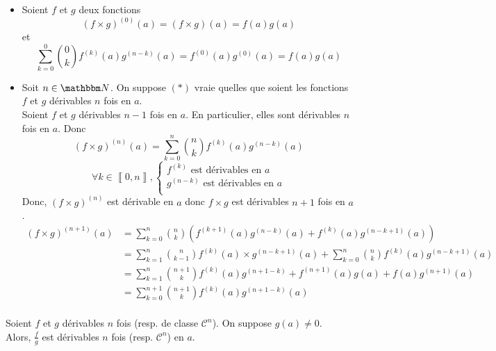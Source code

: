 \begin{prv}
	\begin{itemize}
		\item Soient $f$ et $g$ deux fonctions
			\[
				\left( f\times g \right) ^{(0)}(a) = \left( f\times g \right) (a) = f(a) g(a)
			\] et \[
				\sum_{k=0}^0 {0\choose k} f^{(k)}(a) g^{(n-k)}(a) = f^{(0)}(a) g^{(0)}(a) = f(a) g(a)
			\]
		\item Soit $n \in \N$. On suppose $(*)$ vraie quelles que soient les fonctions $f$ et $g$ dérivables $n$ fois en $a$.\\
			Soient $f$ et $g$ dérivables $n-1$ fois en $a$. En particulier, elles sont dérivables $n$ fois en $a$. Donc \[
				(f\times g)^{(n)}(a) = \sum_{k=0}^{n} {n\choose k} f^{(k)}(a) g^{(n-k)}(a)
			\]
			\[
				\forall k \in \left\llbracket 0,n \right\rrbracket,
				\begin{cases}
					f^{(k)} \text{ est dérivables en } a\\
					g^{(n-k)} \text{ est dérivables en } a\\
				\end{cases}
			\] 
			Donc, $(f\times g)^{(n)}$ est dérivable en $a$ donc $f\times g$ est dérivables $n+1$ fois en $a$.\\
			\begin{align*}
				(f\times g)^{(n+1)}(a)
				&= \sum_{k=0}^{n} {n\choose k} \left( f^{(k+1)}(a) g^{(n-k)}(a) + f^{(k)}(a)g^{(n-k+1)}(a) \right)  \\
				&= \sum_{k=1}^{n} {n\choose k-1} f^{(k)}(a) \times g^{(n-k+1)}(a)  + \sum_{k=0}^{n} {n \choose k} f^{(k)}(a) g^{(n-k+1)}(a)\\
				&= \sum_{k=1}^{n} {n+1\choose k} f^{(k)}(a) g^{(n+1-k)}+f^{(n+1)}(a) g(a) + f(a)g^{(n+1)}(a) \\
				&= \sum_{k=0}^{n+1} {n+1\choose k} f^{(k)}(a) g^{(n+1-k)}(a) \\
			\end{align*}
	\end{itemize}
\end{prv}

\begin{prop}
	Soient $f$ et $g$ dérivables $n$ fois (resp. de classe $\mathcal{C}^n$). On suppose $g(a) \neq 0$.\\
	Alors, $\frac{f}{g}$ est dérivables $n$ fois (resp. $\mathcal{C}^n$) en $a$.
\end{prop}

